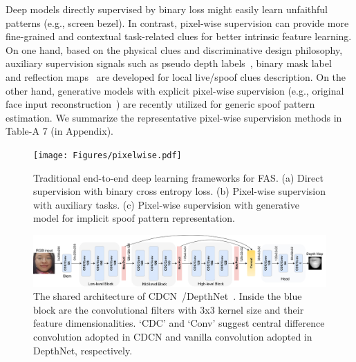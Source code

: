 \documentclass[10pt,journal,compsoc]{IEEEtran}
\begin{document}
Deep models directly supervised by binary loss might easily learn unfaithful patterns (e.g., screen bezel). In contrast, pixel-wise supervision can provide more fine-grained and contextual task-related clues for better intrinsic feature learning. On one hand, based on the physical clues and discriminative design philosophy, auxiliary supervision signals such as pseudo depth labels~\cite{Atoum2018Face,Liu2018Learning}, binary mask label~\cite{george2019deep,liu2019deep,sun2020face} and reflection maps~\cite{yu2020face,kim2019basn} are developed for local live/spoof clues description. On the other hand, generative models with explicit pixel-wise supervision (e.g., original face input reconstruction~\cite{mohammadi2020improving,liu2020physics}) are recently utilized for generic spoof pattern estimation. We summarize the representative pixel-wise supervision methods in Table-A 7 (in Appendix). 







 
\begin{figure}
\centering
\texttt{[image: Figures/pixelwise.pdf]}
  \caption{ 
   Traditional end-to-end deep learning frameworks for FAS. (a) Direct supervision with binary cross entropy loss. (b) Pixel-wise supervision with auxiliary tasks. (c) Pixel-wise supervision with generative model for implicit spoof pattern representation.
  }
\label{fig:pixelwise}
\end{figure}



\begin{figure}
\centering
\includegraphics[scale=0.45]{Figures/DepthNetCDCN.png}
  \caption{ 
   The shared architecture of CDCN~\cite{yu2020searching}/DepthNet~\cite{Liu2018Learning}. Inside the blue block are the convolutional filters with 3x3 kernel size and their feature dimensionalities. `CDC' and `Conv' suggest central difference convolution adopted in CDCN and vanilla convolution adopted in DepthNet, respectively.}
  
\label{fig:cdcn}
\end{figure}
\end{document}
